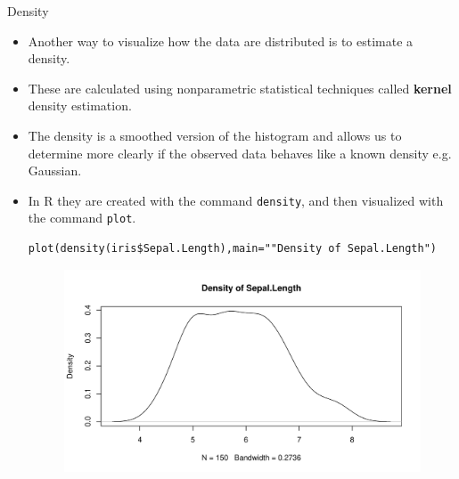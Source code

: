 \documentclass[handout]{beamer}
\begin{document}
\begin{frame}[fragile]{Density}
\scriptsize{
\begin{itemize}
 \item Another way to visualize how the data are distributed is to estimate a density.
 \item These are calculated using nonparametric statistical techniques called \textbf{kernel} density estimation.
 \item The density is a smoothed version of the histogram and allows us to determine more clearly if the observed data behaves like a known density e.g. Gaussian.  
 \item In R they are created with the command \verb+density+, and then visualized with the command \verb+plot+.

 \begin{verbatim}
plot(density(iris$Sepal.Length),main=""Density of Sepal.Length")
 \end{verbatim}
 \begin{figure}[h!]
	\centering
	\includegraphics[scale=0.38]{pics/density.pdf}
	
	
\end{figure} 

\end{itemize}




}
\end{frame}
\end{document}
